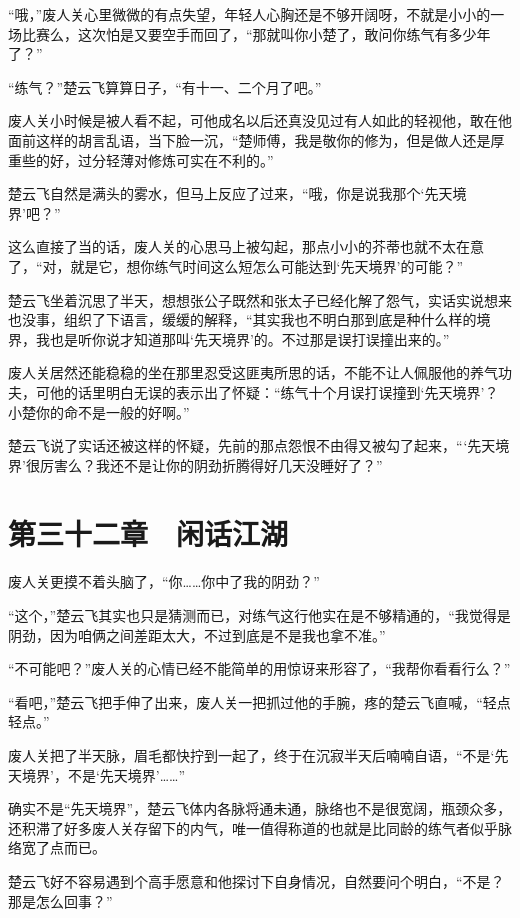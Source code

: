 “哦，”废人关心里微微的有点失望，年轻人心胸还是不够开阔呀，不就是小小的一场比赛么，这次怕是又要空手而回了，“那就叫你小楚了，敢问你练气有多少年了？”

“练气？”楚云飞算算日子，“有十一、二个月了吧。”

废人关小时候是被人看不起，可他成名以后还真没见过有人如此的轻视他，敢在他面前这样的胡言乱语，当下脸一沉，“楚师傅，我是敬你的修为，但是做人还是厚重些的好，过分轻薄对修炼可实在不利的。”

楚云飞自然是满头的雾水，但马上反应了过来，“哦，你是说我那个‘先天境界’吧？”

这么直接了当的话，废人关的心思马上被勾起，那点小小的芥蒂也就不太在意了，“对，就是它，想你练气时间这么短怎么可能达到‘先天境界’的可能？”

楚云飞坐着沉思了半天，想想张公子既然和张太子已经化解了怨气，实话实说想来也没事，组织了下语言，缓缓的解释，“其实我也不明白那到底是种什么样的境界，我也是听你说才知道那叫‘先天境界’的。不过那是误打误撞出来的。”

废人关居然还能稳稳的坐在那里忍受这匪夷所思的话，不能不让人佩服他的养气功夫，可他的话里明白无误的表示出了怀疑：“练气十个月误打误撞到‘先天境界’？小楚你的命不是一般的好啊。”

楚云飞说了实话还被这样的怀疑，先前的那点怨恨不由得又被勾了起来，“‘先天境界’很厉害么？我还不是让你的阴劲折腾得好几天没睡好了？”

\section{第三十二章　闲话江湖}

废人关更摸不着头脑了，“你……你中了我的阴劲？”

“这个，”楚云飞其实也只是猜测而已，对练气这行他实在是不够精通的，“我觉得是阴劲，因为咱俩之间差距太大，不过到底是不是我也拿不准。”

“不可能吧？”废人关的心情已经不能简单的用惊讶来形容了，“我帮你看看行么？”

“看吧，”楚云飞把手伸了出来，废人关一把抓过他的手腕，疼的楚云飞直喊，“轻点轻点。”

废人关把了半天脉，眉毛都快拧到一起了，终于在沉寂半天后喃喃自语，“不是‘先天境界’，不是‘先天境界’……”

确实不是“先天境界”，楚云飞体内各脉将通未通，脉络也不是很宽阔，瓶颈众多，还积滞了好多废人关存留下的内气，唯一值得称道的也就是比同龄的练气者似乎脉络宽了点而已。

楚云飞好不容易遇到个高手愿意和他探讨下自身情况，自然要问个明白，“不是？那是怎么回事？”


